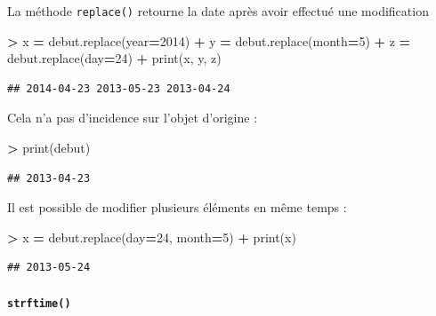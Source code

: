 \documentclass[12pt,]{book}
\newenvironment{Shaded}{\begin{snugshade}}{\end{snugshade}}
\newcommand{\DecValTok}[1]{\textcolor[rgb]{0.00,0.00,0.81}{#1}}
\newcommand{\OperatorTok}[1]{\textcolor[rgb]{0.81,0.36,0.00}{\textbf{#1}}}
\newcommand{\BuiltInTok}[1]{#1}
\newcommand{\NormalTok}[1]{#1}
\let\oldparagraph\paragraph
\renewcommand{\paragraph}[1]{\oldparagraph{#1}\mbox{}}
\numberwithin{equation}{section}
\numberwithin{countremarque}{section}
\begin{document}
La méthode \texttt{replace()} retourne la date après avoir effectué une
modification

\begin{Shaded}
\begin{Highlighting}[]
\OperatorTok{>}\NormalTok{ x }\OperatorTok{=}\NormalTok{ debut.replace(year}\OperatorTok{=}\DecValTok{2014}\NormalTok{)}
\OperatorTok{+}\NormalTok{ y }\OperatorTok{=}\NormalTok{ debut.replace(month}\OperatorTok{=}\DecValTok{5}\NormalTok{)}
\OperatorTok{+}\NormalTok{ z }\OperatorTok{=}\NormalTok{ debut.replace(day}\OperatorTok{=}\DecValTok{24}\NormalTok{)}
\OperatorTok{+} \BuiltInTok{print}\NormalTok{(x, y, z)}
\end{Highlighting}
\end{Shaded}

\begin{lstlisting}
## 2014-04-23 2013-05-23 2013-04-24
\end{lstlisting}

Cela n'a pas d'incidence sur l'objet d'origine :

\begin{Shaded}
\begin{Highlighting}[]
\OperatorTok{>} \BuiltInTok{print}\NormalTok{(debut)}
\end{Highlighting}
\end{Shaded}

\begin{lstlisting}
## 2013-04-23
\end{lstlisting}

Il est possible de modifier plusieurs éléments en même temps :

\begin{Shaded}
\begin{Highlighting}[]
\OperatorTok{>}\NormalTok{ x }\OperatorTok{=}\NormalTok{ debut.replace(day}\OperatorTok{=}\DecValTok{24}\NormalTok{, month}\OperatorTok{=}\DecValTok{5}\NormalTok{)}
\OperatorTok{+} \BuiltInTok{print}\NormalTok{(x)}
\end{Highlighting}
\end{Shaded}

\begin{lstlisting}
## 2013-05-24
\end{lstlisting}

\paragraph{\texorpdfstring{\texttt{strftime()}}{strftime()}}\label{strftime}
\end{document}
